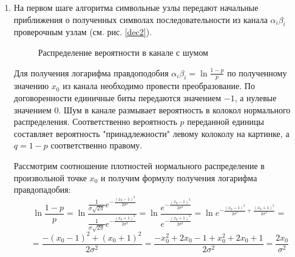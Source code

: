 \begin{enumerate}[label=\arabic*.]
\item
На первом шаге алгоритма символьные узлы передают начальные приближения о
полученных символах последовательности из канала $\alpha_i \beta_i$ проверочным узлам (см. рис. \ref{dec2}).


\begin{figure}
\centering
{}
\caption{Распределение вероятности в канале с шумом}
\end{figure}

Для получения логарифма правдоподобия $\alpha_i\beta_i=\ln \frac{1-p}{p}$ 
по полученному значению $x_0$ из канала необходимо
провести преобразование. По договоренности единичные биты передаются значением $-1$, а нулевые значением
$0$. Шум в канале размывает вероятность в колокол нормального распределения. Соответственно
вероятность $p$ переданной единицы составляет вероятность "принадлежности" левому колоколу на картинке,
а $q=1-p$ соответственно правому.

Рассмотрим соотношение плотностей нормального распределение в произвольной точке $x_0$ и получим
формулу получения логарифма правдопадобия:
\[
\ln\frac{1-p}{p}=\ln \frac{\frac{1}{\sigma \sqrt{2 \pi}} e^{-\frac{(x_0-1)^2}{2\sigma^2}}}
         {\frac{1}{\sigma \sqrt{2 \pi}} e^{-\frac{(x_0+1)^2}{2\sigma^2}}} =
         \ln \frac{e^{-\frac{(x_0-1)^2}{2\sigma^2}}}
         		  {e^{-\frac{(x_0+1)^2}{2\sigma^2}}}=
         		 \ln e^{-\frac{(x_0-1)^2}{2\sigma^2}+\frac{(x_0+1)^2}{2\sigma^2}}=
\]
\[
	= \frac{-(x_0-1)^2+(x_0+1)^2}{2\sigma^2}=\frac{-x_0^2+2x_0-1+x_0^2+2x_0+1}{2\sigma^2}=
	 \frac{2x_0}{\sigma^2}
\]


\end{enumerate}
